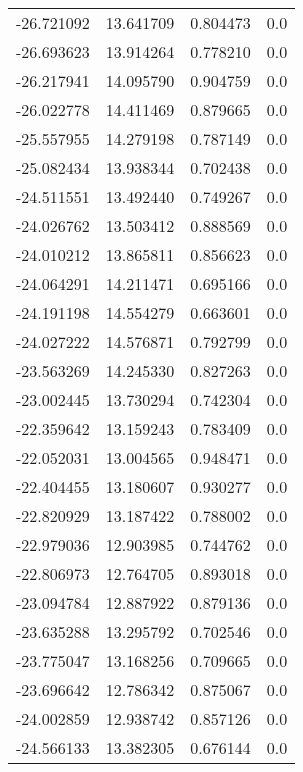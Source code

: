 \begin{tabular}{rrrr}
      -26.721092 &        13.641709 &    0.804473 &   0.0 \\
      -26.693623 &        13.914264 &    0.778210 &   0.0 \\
      -26.217941 &        14.095790 &    0.904759 &   0.0 \\
      -26.022778 &        14.411469 &    0.879665 &   0.0 \\
      -25.557955 &        14.279198 &    0.787149 &   0.0 \\
      -25.082434 &        13.938344 &    0.702438 &   0.0 \\
      -24.511551 &        13.492440 &    0.749267 &   0.0 \\
      -24.026762 &        13.503412 &    0.888569 &   0.0 \\
      -24.010212 &        13.865811 &    0.856623 &   0.0 \\
      -24.064291 &        14.211471 &    0.695166 &   0.0 \\
      -24.191198 &        14.554279 &    0.663601 &   0.0 \\
      -24.027222 &        14.576871 &    0.792799 &   0.0 \\
      -23.563269 &        14.245330 &    0.827263 &   0.0 \\
      -23.002445 &        13.730294 &    0.742304 &   0.0 \\
      -22.359642 &        13.159243 &    0.783409 &   0.0 \\
      -22.052031 &        13.004565 &    0.948471 &   0.0 \\
      -22.404455 &        13.180607 &    0.930277 &   0.0 \\
      -22.820929 &        13.187422 &    0.788002 &   0.0 \\
      -22.979036 &        12.903985 &    0.744762 &   0.0 \\
      -22.806973 &        12.764705 &    0.893018 &   0.0 \\
      -23.094784 &        12.887922 &    0.879136 &   0.0 \\
      -23.635288 &        13.295792 &    0.702546 &   0.0 \\
      -23.775047 &        13.168256 &    0.709665 &   0.0 \\
      -23.696642 &        12.786342 &    0.875067 &   0.0 \\
      -24.002859 &        12.938742 &    0.857126 &   0.0 \\
      -24.566133 &        13.382305 &    0.676144 &   0.0 \\

\end{tabular}
